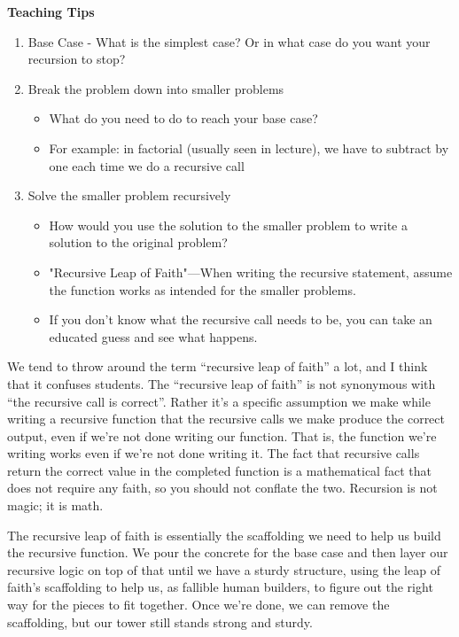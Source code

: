 \begin{meta}
\textbf{Teaching Tips}
\begin{enumerate}
	    \item Base Case - What is the simplest case? Or in what case do you want your recursion to stop?
	    \item Break the problem down into smaller problems
	    \begin{itemize}
			\item What do you need to do to reach your base case?
			\item For example: in factorial (usually seen in lecture), we have to subtract by one each time we do a recursive call
		\end{itemize}
		\item Solve the smaller problem recursively
		\begin{itemize}
			\item How would you use the solution to the smaller problem to write a solution to the original problem?
			\item "Recursive Leap of Faith"---When writing the recursive statement, assume the function works as intended for the smaller problems.
			\item If you don't know what the recursive call needs to be, you can take an educated guess and see what happens. 
		\end{itemize}
\end{enumerate}
We tend to throw around the term ``recursive leap of faith'' a lot, and I think that it confuses students. The ``recursive leap of faith'' is not synonymous with ``the recursive call is correct''. Rather it's a specific assumption we make while writing a recursive function that the recursive calls we make produce the correct output, even if we're not done writing our function. That is, the function we're writing works even if we're not done writing it. The fact that recursive calls return the correct value in the completed function is a mathematical fact that does not require any faith, so you should not conflate the two. Recursion is not magic; it is math.

The recursive leap of faith is essentially the scaffolding we need to help us build the recursive function. We pour the concrete for the base case and then layer our recursive logic on top of that until we have a sturdy structure, using the leap of faith's scaffolding to help us, as fallible human builders, to figure out the right way for the pieces to fit together. Once we're done, we can remove the scaffolding, but our tower still stands strong and sturdy. 
\end{meta}
